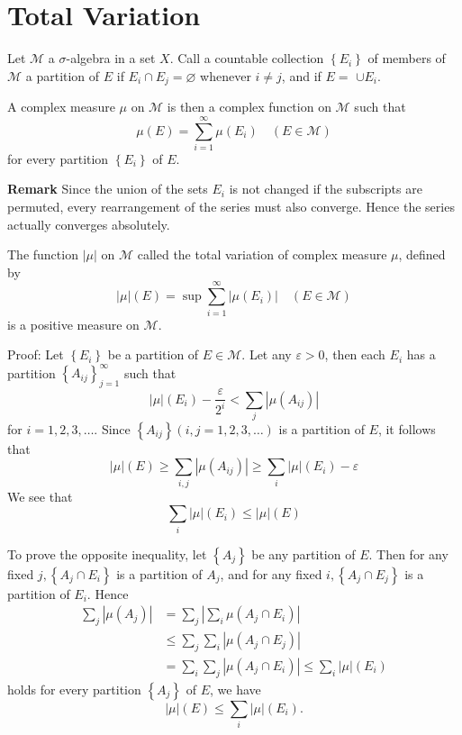 \documentclass[12pt, a4paper, oneside]{book}
\begin{document}
\section{Total Variation}
\begin{definition}
    Let $\mathcal{M}$ a $\sigma$-algebra in a set $X$. Call a countable collection $\left\{E_{i}\right\}$ of members of $\mathcal{M}$ a partition of $E$ if $E_{i} \cap E_{j}=\varnothing$ whenever $i \neq j$, and if $E=$ $\cup E_{i}$.

    A complex measure $\mu$ on $\mathcal{M}$ is then a complex function on $\mathcal{M}$ such that
    $$
        \mu(E)=\sum_{i=1}^{\infty} \mu\left(E_{i}\right) \quad(E \in \mathcal{M})
    $$
    for every partition $\left\{E_{i}\right\}$ of $E$.

    \textbf{Remark} Since the union of the sets $E_{i}$ is not changed if the subscripts are permuted, every rearrangement of the series must also converge. Hence the series actually converges absolutely.
\end{definition}
\begin{definition}
    The function $|\mu|$ on $\mathcal{M}$ called the total variation of complex measure $\mu$, defined by
    $$
        |\mu|(E)=\sup \sum_{i=1}^{\infty}\left|\mu\left(E_{i}\right)\right| \quad(E \in \mathcal{M})
    $$
    is a positive measure on $\mathcal{M}$.

    Proof:
    Let $\left\{E_{i}\right\}$ be a partition of $E \in \mathcal{M}$.
    Let any $\varepsilon>0$,
    then each $E_{i}$ has a partition $\left\{A_{i j}\right\}_{j=1}^\infty$ such that
    $$
        |\mu|(E_i)-\frac{\varepsilon }{2^i} < \sum_{j}\left|\mu\left(A_{i j}\right)\right|
    $$
    for $i=1,2,3, \ldots$. Since $\left\{A_{i j}\right\}(i, j=1,2,3, \ldots)$ is a partition of $E$, it follows that
    $$
        |\mu|(E) \geq
        \sum_{i, j}\left|\mu\left(A_{i j}\right)\right| \geq
        \sum_i |\mu|(E_i) -\varepsilon
    $$
    We see that
    $$
        \sum_{i}|\mu|\left(E_{i}\right) \leq|\mu|(E)
    $$

    To prove the opposite inequality, let $\left\{A_{j}\right\}$ be any partition of $E$. Then for any fixed $j,\left\{A_{j} \cap E_{i}\right\}$ is a partition of $A_{j}$, and for any fixed $i,\left\{A_{j} \cap E_{j}\right\}$ is a partition of $E_{i}$. Hence
    $$
        \begin{aligned}
            \sum_{j}\left|\mu\left(A_{j}\right)\right| & =\sum_{j}\left|\sum_{i} \mu\left(A_{j} \cap E_{i}\right)\right|                                      \\
                                                       & \leq \sum_{j} \sum_{i}\left|\mu\left(A_{j} \cap E_{j}\right)\right|                                  \\
                                                       & =\sum_{i} \sum_{j}\left|\mu\left(A_{j} \cap E_{i}\right)\right| \leq \sum_{i}|\mu|\left(E_{i}\right)
        \end{aligned}
    $$
    holds for every partition $\left\{A_{j}\right\}$ of $E$, we have
    \begin{equation}
        |\mu|(E) \leq \sum_{i}|\mu|\left(E_{i}\right) . \tag{5}
    \end{equation}
\end{definition}
\end{document}

